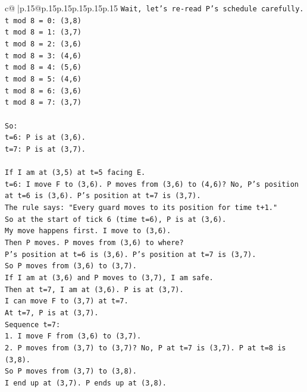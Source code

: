 \documentclass{article}
\begin{document}
{\begin{supertabular}{c@{$\;$}|p{.15\linewidth}@{}p{.15\linewidth}p{.15\linewidth}p{.15\linewidth}p{.15\linewidth}p{.15\linewidth}}
{{{\texttt{Wait, let's re{-}read P's schedule carefully.} \\
\texttt{t mod 8 = 0: (3,8)} \\
\texttt{t mod 8 = 1: (3,7)} \\
\texttt{t mod 8 = 2: (3,6)} \\
\texttt{t mod 8 = 3: (4,6)} \\
\texttt{t mod 8 = 4: (5,6)} \\
\texttt{t mod 8 = 5: (4,6)} \\
\texttt{t mod 8 = 6: (3,6)} \\
\texttt{t mod 8 = 7: (3,7)} \\
\\ 
\texttt{So:} \\
\texttt{t=6: P is at (3,6).} \\
\texttt{t=7: P is at (3,7).} \\
\\ 
\texttt{If I am at (3,5) at t=5 facing E.} \\
\texttt{t=6: I move F to (3,6). P moves from (3,6) to (4,6)? No, P's position at t=6 is (3,6). P's position at t=7 is (3,7).} \\
\texttt{The rule says: "Every guard moves to its position for time t+1."} \\
\texttt{So at the start of tick 6 (time t=6), P is at (3,6).} \\
\texttt{My move happens first. I move to (3,6).} \\
\texttt{Then P moves. P moves from (3,6) to where?} \\
\texttt{P's position at t=6 is (3,6). P's position at t=7 is (3,7).} \\
\texttt{So P moves from (3,6) to (3,7).} \\
\texttt{If I am at (3,6) and P moves to (3,7), I am safe.} \\
\texttt{Then at t=7, I am at (3,6). P is at (3,7).} \\
\texttt{I can move F to (3,7) at t=7.} \\
\texttt{At t=7, P is at (3,7).} \\
\texttt{Sequence t=7:} \\
\texttt{1. I move F from (3,6) to (3,7).} \\
\texttt{2. P moves from (3,7) to (3,7)? No, P at t=7 is (3,7). P at t=8 is (3,8).} \\
\texttt{So P moves from (3,7) to (3,8).} \\
\texttt{I end up at (3,7). P ends up at (3,8).} \\
}}}
\end{supertabular}}
\end{document}
